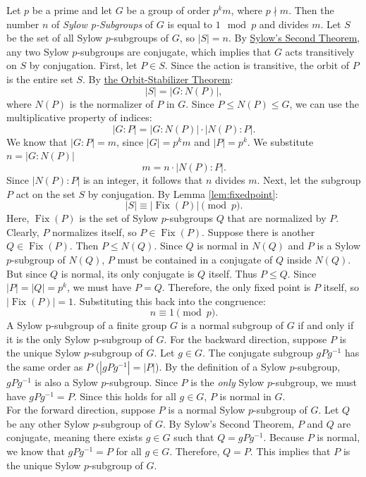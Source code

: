 \documentclass[a4paper,12pt]{article}
\begin{document}
{
    Let $p$ be a prime and let $G$ be a group of order $p^km$, where $p \nmid m.$ Then the number $n$ of \textit{Sylow p-Subgroups} of $G$ is equal to $1 \mod p$ and divides $m.$
}
{
    Let $S$ be the set of all Sylow $p$-subgroups of $G$, so $|S| = n$. By \hyperref[thm:sylowsT]{Sylow's Second Theorem}, any two Sylow $p$-subgroups are conjugate, which implies that $G$ acts transitively on $S$ by conjugation.
    First, let $P \in S$. Since the action is transitive, the orbit of $P$ is the entire set $S$. By \hyperref[thm:orbit_stabilizer]{the Orbit-Stabilizer Theorem}:
    \[ |S| = |G : N(P)|, \]
    where $N(P)$ is the normalizer of $P$ in $G$.
    Since $P \le N(P) \le G$, we can use the multiplicative property of indices:
    \[ |G:P| = |G:N(P)| \cdot |N(P):P|. \]
    We know that $|G:P| = m$, since $|G|=p^k m$ and $|P|=p^k$. We substitute $n = |G:N(P)|$
    \[ m = n \cdot |N(P):P|. \]
    Since $|N(P):P|$ is an integer, it follows that $n$ divides $m$.
    Next, let the subgroup $P$ act on the set $S$ by conjugation. By Lemma \ref{lem:fixedpoint}:
    \[ |S| \equiv |\operatorname{Fix}(P)| \pmod p. \]
    Here, $\operatorname{Fix}(P)$ is the set of Sylow $p$-subgroups $Q$ that are normalized by $P$.
    Clearly, $P$ normalizes itself, so $P \in \operatorname{Fix}(P)$.
    Suppose there is another $Q \in \operatorname{Fix}(P)$. Then $P \le N(Q)$. Since $Q$ is normal in $N(Q)$ and $P$ is a Sylow $p$-subgroup of $N(Q)$, $P$ must be contained in a conjugate of $Q$ inside $N(Q)$. But since $Q$ is normal, its only conjugate is $Q$ itself. Thus $P \le Q$. Since $|P|=|Q|=p^k$, we must have $P=Q$.
    Therefore, the only fixed point is $P$ itself, so $|\operatorname{Fix}(P)| = 1$.
    Substituting this back into the congruence:
    \[ n \equiv 1 \pmod p.\]
}
{
    A Sylow p-subgroup of a finite group $G$ is a normal subgroup of $G$ if
and only if it is the only Sylow p-subgroup of $G$.
}
{
        For the backward direction,
    suppose $P$ is the unique Sylow $p$-subgroup of $G$. Let $g \in G$. The conjugate subgroup $gPg^{-1}$ has the same order as $P$ ($|gPg^{-1}| = |P|$). By the definition of a Sylow $p$-subgroup, $gPg^{-1}$ is also a Sylow $p$-subgroup.
    Since $P$ is the \textit{only} Sylow $p$-subgroup, we must have $gPg^{-1} = P$. Since this holds for all $g \in G$, $P$ is normal in $G$.
    \\For the forward direction,
    suppose $P$ is a normal Sylow $p$-subgroup of $G$. Let $Q$ be any other Sylow $p$-subgroup of $G$.
    By Sylow's Second Theorem, $P$ and $Q$ are conjugate, meaning there exists $g \in G$ such that $Q = gPg^{-1}$.
    Because $P$ is normal, we know that $gPg^{-1} = P$ for all $g \in G$.
    Therefore, $Q = P$. This implies that $P$ is the unique Sylow $p$-subgroup of $G$.
}
\end{document}
